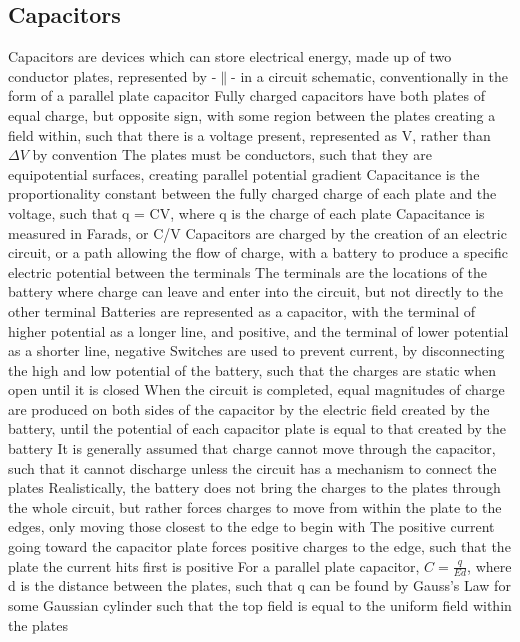 \documentclass[11 pt, twoside]{article}
\newenvironment{outline*}
{
	\begin{outline}[enumerate]
	}
	{\end{outline}
}
\begin{document}
\subsection{Capacitors}
\begin{outline*}
\1 Capacitors are devices which can store electrical energy, made up of two conductor plates, represented by -$\|$- in a circuit schematic, conventionally in the form of a parallel plate capacitor
\2 Fully charged capacitors have both plates of equal charge, but opposite sign, with some region between the plates creating a field within, such that there is a voltage present, represented as V, rather than $\Delta V$ by convention
\3 The plates must be conductors, such that they are equipotential surfaces, creating parallel potential gradient
\2 Capacitance is the proportionality constant between the fully charged charge of each plate and the voltage, such that q = CV, where q is the charge of each plate
\3 Capacitance is measured in Farads, or C/V
\1 Capacitors are charged by the creation of an electric circuit, or a path allowing the flow of charge, with a battery to produce a specific electric potential between the terminals
\2 The terminals are the locations of the battery where charge can leave and enter into the circuit, but not directly to the other terminal
\2 Batteries are represented as a capacitor, with the terminal of higher potential as a longer line, and positive, and the terminal of lower potential as a shorter line, negative
\2 Switches are used to prevent current, by disconnecting the high and low potential of the battery, such that the charges are static when open until it is closed
\2 When the circuit is completed, equal magnitudes of charge are produced on both sides of the capacitor by the electric field created by the battery, until the potential of each capacitor plate is equal to that created by the battery
\3 It is generally assumed that charge cannot move through the capacitor, such that it cannot discharge unless the circuit has a mechanism to connect the plates
\3 Realistically, the battery does not bring the charges to the plates through the whole circuit, but rather forces charges to move from within the plate to the edges, only moving those closest to the edge to begin with
\3 The positive current going toward the capacitor plate forces positive charges to the edge, such that the plate the current hits first is positive
\1 For a parallel plate capacitor, $C = \frac{q}{Ed}$, where d is the distance between the plates, such that q can be found by Gauss's Law for some Gaussian cylinder such that the top field is equal to the uniform field within the plates

\end{outline*}
\end{document}
